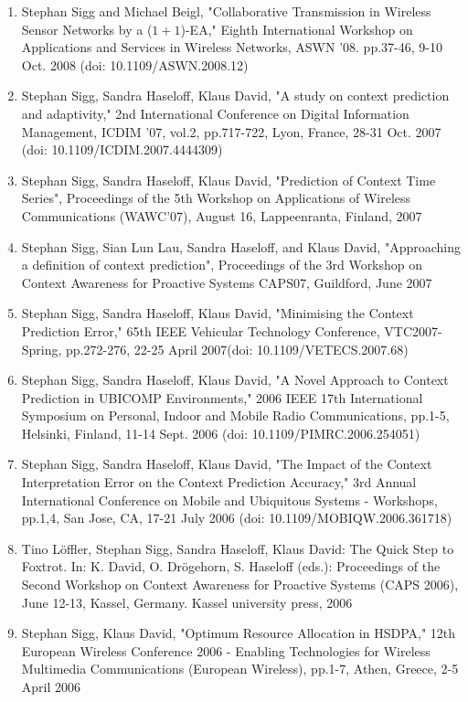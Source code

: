 \documentclass[12pt]{article}
\newcounter{saveenumi}
\begin{document}
\begin{enumerate}
\item Stephan Sigg and Michael Beigl, "Collaborative Transmission in Wireless Sensor Networks by a ($1+1$)-EA," Eighth International Workshop on Applications and Services in Wireless Networks, ASWN '08. pp.37-46, 9-10 Oct. 2008 (doi: 10.1109/ASWN.2008.12)
\item Stephan Sigg, Sandra Haseloff, Klaus David, "A study on context prediction and adaptivity," 2nd International Conference on Digital Information Management, ICDIM '07, vol.2, pp.717-722, Lyon, France, 28-31 Oct. 2007 (doi: 10.1109/ICDIM.2007.4444309)
\item Stephan Sigg, Sandra Haseloff, Klaus David, "Prediction of Context Time Series", Proceedings of the 5th Workshop on Applications of Wireless Communications (WAWC'07), August 16, Lappeenranta, Finland, 2007
\item Stephan Sigg, Sian Lun Lau, Sandra Haseloff, and Klaus David, "Approaching a definition of context prediction", Proceedings of the 3rd Workshop on Context Awareness for Proactive Systems CAPS07, Guildford, June 2007
\item Stephan Sigg, Sandra Haseloff, Klaus David, "Minimising the Context Prediction Error,"  65th IEEE Vehicular Technology Conference, VTC2007-Spring, pp.272-276, 22-25 April 2007\linebreak (doi: 10.1109/VETECS.2007.68)
\item Stephan Sigg, Sandra Haseloff, Klaus David, "A Novel Approach to Context Prediction in UBICOMP Environments," 2006 IEEE 17th International Symposium on Personal, Indoor and Mobile Radio Communications, pp.1-5, Helsinki, Finland, 11-14 Sept. 2006 (doi: 10.1109/PIMRC.2006.254051)
\item Stephan Sigg, Sandra Haseloff, Klaus David, "The Impact of the Context Interpretation Error on the Context Prediction Accuracy," 3rd Annual International Conference on Mobile and Ubiquitous Systems - Workshops, pp.1,4, San Jose, CA, 17-21 July 2006 (doi: 10.1109/MOBIQW.2006.361718)
\item Tino Löffler, Stephan Sigg, Sandra Haseloff, Klaus David: The Quick Step to Foxtrot. In: K. David, O. Drögehorn, S. Haseloff (eds.): Proceedings of the Second Workshop on Context Awareness for Proactive Systems (CAPS 2006), June 12-13, Kassel, Germany. Kassel university press, 2006
\item Stephan Sigg, Klaus David, "Optimum Resource Allocation in HSDPA," 12th European Wireless Conference 2006 - Enabling Technologies for Wireless Multimedia Communications (European Wireless), pp.1-7, Athen, Greece, 2-5 April 2006
\setcounter{saveenumi}{\value{enumi}}
\end{enumerate}
\end{document}
